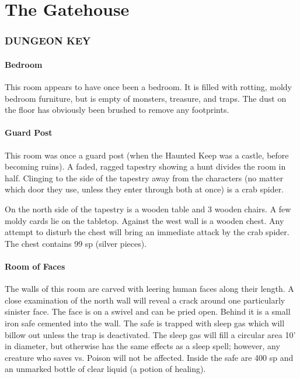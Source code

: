 \documentclass[letterpaper,serif]{rpg-module}
\begin{document}
\part{The Gatehouse}


\section*{DUNGEON KEY}


\subsection{Bedroom}

This room appears to have once been a bedroom. It is filled with rotting, moldy
bedroom furniture, but is empty of monsters, treasure, and traps. The dust on
the floor has obviously been brushed to remove any footprints.

\subsection{Guard Post}

This room was once a guard post (when the Haunted Keep was a castle, before
becoming ruins). A faded, ragged tapestry showing a hunt divides the room in
half. Clinging to the side of the tapestry away from the characters (no
matter which door they use, unless they enter through both at
once) is a crab spider.



On the north side of the tapestry is a wooden table and 3 wooden
chairs. A few moldy cards lie on the tabletop. Against the west wall
is a wooden chest. Any attempt to disturb the chest will bring an
immediate attack by the crab spider. The chest contains 99 sp
(silver pieces).

\subsection{Room of Faces}

The walls of this room are carved with leering human faces along their length.
A close examination of the north wall will reveal a crack around one particularly
sinister face. The face is on a swivel and can be pried open. Behind it is a
small iron safe cemented into the wall. The safe is trapped with
sleep gas which will billow out unless the trap is deactivated. The
sleep gas will fill a circular area 10' in diameter, but otherwise has
the same effects as a sleep spell; however, any creature who saves
vs. Poison will not be affected. Inside the safe are 400 sp and an
unmarked bottle of clear liquid (a potion of healing).
\end{document}
